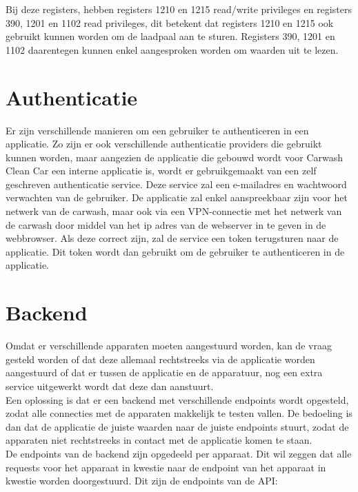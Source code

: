 Bij deze registers, hebben registers 1210 en 1215 read/write privileges en registers 390, 1201 en 1102 read privileges, dit betekent dat registers 1210 en 1215 ook gebruikt kunnen worden om de laadpaal aan te sturen. Registers 390, 1201 en 1102 daarentegen kunnen enkel aangesproken worden om waarden uit te lezen.

\section{Authenticatie}
\label{sec:stand-van-zaken-authenticatie}

Er zijn verschillende manieren om een gebruiker te authenticeren in een applicatie. Zo zijn er ook verschillende authenticatie providers die gebruikt kunnen worden, maar aangezien de applicatie die gebouwd wordt voor Carwash Clean Car een interne applicatie is, wordt er gebruikgemaakt van een zelf geschreven authenticatie service. Deze service zal een e-mailadres en wachtwoord verwachten van de gebruiker. De applicatie zal enkel aanspreekbaar zijn voor het netwerk van de carwash, maar ook via een VPN-connectie met het netwerk van de carwash door middel van het ip adres van de webserver in te geven in de webbrowser. Als deze correct zijn, zal de service een token terugsturen naar de applicatie. Dit token wordt dan gebruikt om de gebruiker te authenticeren in de applicatie.

\section{Backend}
\label{sec:stand-van-zaken-backend}

Omdat er verschillende apparaten moeten aangestuurd worden, kan de vraag gesteld worden of dat deze allemaal rechtstreeks via de applicatie worden aangestuurd of dat er tussen de applicatie en de apparatuur, nog een extra service uitgewerkt wordt dat deze dan aanstuurt.\\

Een oplossing is dat er een backend met verschillende endpoints wordt opgesteld, zodat alle connecties met de apparaten makkelijk te testen vallen. De bedoeling is dan dat de applicatie de juiste waarden naar de juiste endpoints stuurt, zodat de apparaten niet rechtstreeks in contact met de applicatie komen te staan.\\

De endpoints van de backend zijn opgedeeld per apparaat. Dit wil zeggen dat alle requests voor het apparaat in kwestie naar de endpoint van het apparaat in kwestie worden doorgestuurd. Dit zijn de endpoints van de API:

